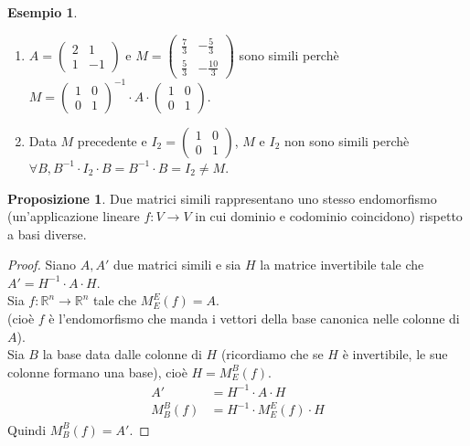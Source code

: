 \documentclass[a4paper]{article}
\theoremstyle{definition}
\newtheorem*{es}{Esempio}
\newtheorem*{prop}{Proposizione}
\begin{document}
\begin{es} \
	\begin{enumerate}
		\item $A = \begin{pmatrix}
				      2 & 1  \\
				      1 & -1
			      \end{pmatrix}$ e $M = \begin{pmatrix}
				      \frac{7}{3} & -\frac{5}{3}  \\
				      \frac{5}{3} & -\frac{10}{3}
			      \end{pmatrix}$ sono simili perchè $M = \begin{pmatrix}
				      1 & 0 \\
				      0 & 1
			      \end{pmatrix}^{-1} \cdot A \cdot \begin{pmatrix}
				      1 & 0 \\
				      0 & 1
			      \end{pmatrix}$.
		\item Data $M$ precedente e $I_2 = \begin{pmatrix}
				      1 & 0 \\
				      0 & 1
			      \end{pmatrix}$, $M$ e $I_2$ non sono simili perchè $\forall B, B^{-1} \cdot I_2 \cdot B = B^{-1} \cdot B = I_2 \neq M$.
	\end{enumerate}
\end{es}
\begin{prop}
	Due matrici simili rappresentano uno stesso endomorfismo (un'applicazione lineare $f: V \rightarrow V$ in cui dominio e codominio coincidono) rispetto a basi diverse.
\end{prop}
\begin{proof}
	Siano $A, A'$ due matrici simili e sia $H$ la matrice invertibile tale che $A' = H^{-1} \cdot A \cdot H$. \\
	Sia $f: \mathbb{R}^n \rightarrow \mathbb{R}^n$ tale che $M_E^E(f) = A$. \\ (cioè $f$ è l'endomorfismo che manda i vettori della base canonica nelle colonne di $A$). \\
	Sia $B$ la base data dalle colonne di $H$ (ricordiamo che se $H$ è invertibile, le sue colonne formano una base), cioè $H = M_E^B(f)$.
	\begin{align*}
		A' & = H^{-1} \cdot A \cdot H \\
		M_B^B(f) & = H^{-1} \cdot M_E^E(f) \cdot H
	\end{align*}
	Quindi $M_B^B(f) = A'$.
\end{proof}
\end{document}
